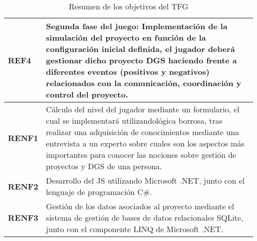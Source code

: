 \begin{table}[thb]
{\begin{tabular}{|l|p{15cm}|}
		\rowcolor[HTML]{FFCE93} 
		{\color[HTML]{000000} \textbf{REF4}}                                                                   & {\color[HTML]{000000} Segunda fase del juego: Implementación de la simulación del proyecto en función de la configuración inicial definida, el jugador deberá gestionar dicho proyecto DGS haciendo frente a diferentes eventos (positivos y negativos) relacionados con la comunicación, coordinación y control del proyecto.}             \\ \hline
		\rowcolor[HTML]{CBCEFB} 
		{\color[HTML]{000000} \textbf{RENF1}}                                                                   & {\color[HTML]{000000} Cálculo del nivel del jugador mediante un formulario, el cual se implementará utilizandológica borrosa, tras realizar una adquisición de conocimientos mediante una entrevista a un experto sobre cuales son los aspectos más importantes para conocer las nociones sobre gestión de proyectos y DGS de una persona.} \\ \hline
		\rowcolor[HTML]{CBCEFB} 
		{\color[HTML]{000000} \textbf{RENF2}}                                                                   & {\color[HTML]{000000} Desarrollo del JS utilizando Microsoft .NET, junto con el lenguaje de programación C\#.}                                                                                                                                                                                                                              \\ \hline
		\rowcolor[HTML]{CBCEFB} 
		{\color[HTML]{000000} \textbf{RENF3}}                                                                   & {\color[HTML]{000000} Gestión de los datos asociados al proyecto mediante el sistema de gestión de bases de datos relacionales SQLite, junto con el componente LINQ de Microsoft .NET.}                                                                                                                                                     \\ \hline
	\end{tabular}}
	\caption{Resumen de los objetivos del TFG}
	\label{tab:ResumenObjetivos}
\end{table}